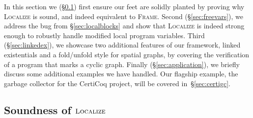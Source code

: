 In this section we (\S\ref{sec:rulessound}) first ensure our feet are solidly planted by proving why \textsc{Localize} is sound, and indeed equivalent to \textsc{Frame}.  Second (\S\ref{sec:freevars}), 
we address the bug from \S\ref{sec:localblocks} and show that \textsc{Localize} is indeed 
strong enough to robustly handle modified local program variables.  Third (\S\ref{sec:linkedex}), 
we showcase two additional features of our framework, linked existentials and a fold/unfold style
for spatial graphs, by covering the verification of a program that marks a cyclic graph.
Finally (\S\ref{sec:application}), we briefly discuss some additional examples we have handled.
Our flagship example, the garbage collector for the CertiCoq project, will be covered in~\S\ref{sec:certigc}.





\subsection{Soundness of $\textsc{Localize}$}
\label{sec:rulessound}

